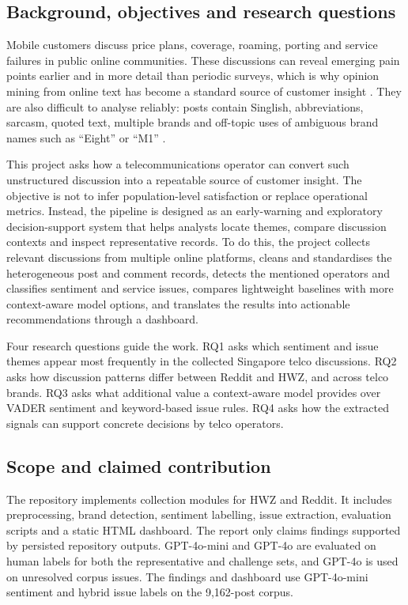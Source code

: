 \documentclass[11pt,a4paper]{article}
\begin{document}
\subsection{Background, objectives and research questions}

Mobile customers discuss price plans, coverage, roaming, porting and service failures in public online communities. These discussions can reveal emerging pain points earlier and in more detail than periodic surveys, which is why opinion mining from online text has become a standard source of customer insight \cite{pang2008opinion}. They are also difficult to analyse reliably: posts contain Singlish, abbreviations, sarcasm, quoted text, multiple brands and off-topic uses of ambiguous brand names such as ``Eight'' or ``M1'' \cite{liu2012sentiment}.

This project asks how a telecommunications operator can convert such unstructured discussion into a repeatable source of customer insight. The objective is not to infer population-level satisfaction or replace operational metrics. Instead, the pipeline is designed as an early-warning and exploratory decision-support system that helps analysts locate themes, compare discussion contexts and inspect representative records. To do this, the project collects relevant discussions from multiple online platforms, cleans and standardises the heterogeneous post and comment records, detects the mentioned operators and classifies sentiment and service issues, compares lightweight baselines with more context-aware model options, and translates the results into actionable recommendations through a dashboard.

Four research questions guide the work. RQ1 asks which sentiment and issue themes appear most frequently in the collected Singapore telco discussions. RQ2 asks how discussion patterns differ between Reddit and HWZ, and across telco brands. RQ3 asks what additional value a context-aware model provides over VADER sentiment and keyword-based issue rules. RQ4 asks how the extracted signals can support concrete decisions by telco operators.

\subsection{Scope and claimed contribution}

The repository implements collection modules for HWZ and Reddit. It includes preprocessing, brand detection, sentiment labelling, issue extraction, evaluation scripts and a static HTML dashboard. The report only claims findings supported by persisted repository outputs. GPT-4o-mini and GPT-4o are evaluated on human labels for both the representative and challenge sets, and GPT-4o is used on unresolved corpus issues. The findings and dashboard use GPT-4o-mini sentiment and hybrid issue labels on the 9,162-post corpus.
\end{document}

